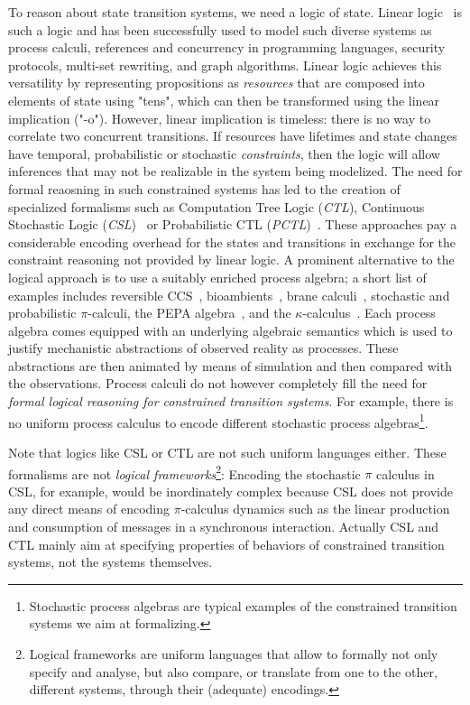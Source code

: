 \documentclass{article}
\newcommand\proofsystem[1]{{\smaller\rmfamily\slshape #1}\xspace}
\begin{document}
To reason about state transition systems, we need a logic of state. 
Linear logic~\cite{girard87tcs} is such a logic and has been successfully used
to model such diverse systems as 
process calculi, references and concurrency in programming languages, 
security protocols, multi-set rewriting, and graph algorithms.
Linear logic achieves this versatility by representing propositions as \emph{resources}
that are composed into elements of state using "tens", which can then be
transformed using the linear implication ("-o").  However, linear implication is
timeless: there is no way to correlate two concurrent transitions.
If resources have lifetimes and state changes have temporal, probabilistic or
stochastic \emph{constraints}, then the logic will allow inferences that may not
be realizable in the system being modelized. 
The need for formal reaosning in such constrained systems has led to the
creation of specialized formalisms such as Computation Tree Logic
(\proofsystem{CTL})\cite{Emerson95}, Continuous Stochastic Logic
(\proofsystem{CSL})~\cite{aziz00tcl} or Probabilistic CTL
(\proofsystem{PCTL})~\cite{hansson94fac}.
These approaches pay a considerable encoding overhead for the states and
transitions in exchange for the constraint reasoning not provided by linear logic.
A prominent alternative to the logical approach is to use a suitably enriched
process algebra; a short list of examples includes 
reversible CCS~\cite{danos03bc}, bioambients~\cite{regev04tcs}, 
brane calculi~\cite{cardelli03bc}, stochastic and probabilistic $\pi$-calculi, 
the PEPA algebra~\cite{hillston96book}, and the $\kappa$-calculus~\cite{danos04tcs}.
Each process algebra comes equipped with an underlying algebraic semantics which
is used to justify mechanistic abstractions of observed reality as processes. 
These abstractions are then animated by means of simulation and then
compared with the observations. 
Process calculi do not however completely fill the need for
{\em formal logical reasoning for constrained transition systems}. 
For example, there is no uniform process calculus to encode 
different stochastic process algebras\footnote{Stochastic process algebras are 
typical examples of the constrained transition systems we aim at formalizing.}. 

Note that logics like CSL or CTL are not such uniform languages either. These formalisms
are not \emph{logical frameworks}\footnote
{
Logical frameworks are uniform languages that allow to formally not only specify and analyse,
but also compare, or translate from one to the other, different systems, through their 
(adequate) encodings.
}: 
Encoding the stochastic $\pi$ calculus in CSL, for example, would be
inordinately complex because CSL does not provide any direct means of encoding
$\pi$-calculus dynamics such as the linear production and consumption of
messages in a synchronous interaction.
Actually CSL and CTL mainly aim at specifying properties of behaviors of constrained 
transition systems, not the systems themselves.
\end{document}
